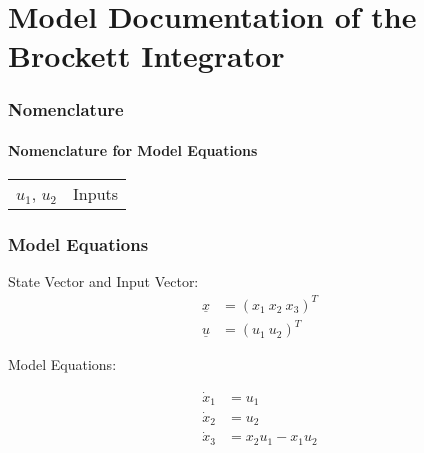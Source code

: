 \documentclass[10pt,a4paper]{article}
\begin{document}
	\part*{Model Documentation of the \\ Brockett Integrator} %
	
	 
	
	
	\section{Nomenclature} %
	\subsection{Nomenclature for Model Equations} %
	
	\begin{tabular}{ll}
		$u_1$, $u_2$ & Inputs		
	\end{tabular}

	
	\section{Model Equations} %
	
	State Vector and Input Vector:
	\begin{align*}
		\underline{x} &= (x_1 \ x_2 \ x_3)^T  \\
		\underline{u} &= (u_1 \ u_2)^T 
	\end{align*}
	
	
	\noindent Model Equations:
	
	\begin{subequations}
	\begin{align}
		\dot{x}_1 &= u_1 \\      %
		\dot{x}_2 &= u_2 \\
		\dot{x}_3 &= x_2 u_1 - x_1 u_2
	\end{align}
	\end{subequations}

	
\end{document}
